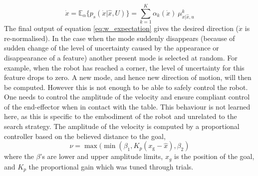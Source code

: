 \begin{equation}\label{eq:w_expectation}
 \dot{x} = \mathbb{E}_{\alpha}\{p_s(\dot{x}|\hat{x},U)\} = \sum\limits_{k=1}^{K} \alpha_{k}(\dot{x}) \:\mu^{k}_{\dot{x}|\hat{x},u}
\end{equation}
% 
%
The final output of equation \ref{eq:w_expectation} gives the desired direction
($\dot{x}$ is re-normalised). In the case when the mode suddenly disappears
(because of sudden change of the level of uncertainty caused by the appearance or disappearance of a feature)
another present mode is selected at random. For example, when the robot has reached a corner, the level of uncertainty for this feature drops to zero.
A new mode, and hence new direction of motion, will then  be computed.
However this is not enough to be able to safely control the robot.
One needs to control the amplitude of the velocity and ensure compliant control 
of the end-effector when in contact with the table. This behaviour is not learned here, as this is specific to 
the embodiment of the robot and unrelated to the search strategy. The 
amplitude of the velocity is computed by a proportional controller based on the
believed distance to the goal,
\begin{equation}
 \nu = \max(\min(\beta_{1},K_{p}(x_{\mathrm{g}} - \hat{x}),\beta_{2})
\end{equation}
where the $\beta$'s are lower and upper amplitude limits, $x_{g}$ is the
position of the goal, and $K_{p}$ the proportional gain which was tuned through
trials.

%
%

